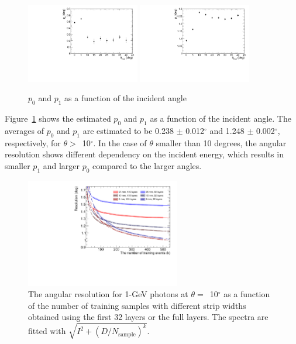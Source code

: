 \documentclass[12pt,times,draftclsnofoot,a4paper]{elsarticle}
\begin{document}
\begin{figure}[!hbt]
\centering
\includegraphics[width=0.44\textwidth]{Fig7_p0.pdf}
\includegraphics[width=0.44\textwidth]{Fig7_p1.pdf}
\caption{ $p_{0}$ and $p_{1}$ as a function of the incident angle }
\label{fig:res_edep}
\end{figure}

Figure~\ref{fig:res_edep} shows the estimated $p_{0}$ and $p_{1}$ as a function of the incident angle. The averages of $p_{0}$ and $p_{1}$ are estimated to be 0.238 $\pm$ 0.012$^{\circ}$ and 1.248 $\pm$ 0.002$^{\circ}$, respectively, for $\theta>$~10$^{\circ}$. In the case of $\theta$ smaller than 10 degrees, the angular resolution shows different dependency on the incident energy, which results in smaller $p_{1}$ and larger $p_{0}$ compared to the larger angles.

\begin{figure}[!hbt]
\centering
\includegraphics[width=0.6\textwidth]{Fig8_nsample_400k_500k.pdf}
\caption{ The angular resolution for 1-GeV photons at $\theta=$~10$^{\circ}$ as a function of the number of training samples with different strip widths obtained using the first 32 layers or the full layers. The spectra are fitted with $\sqrt{I^{2} + (D/N_{\mathrm{sample}})^{k}}$. }
\label{fig:multi-parameter}
\end{figure}
\end{document}
